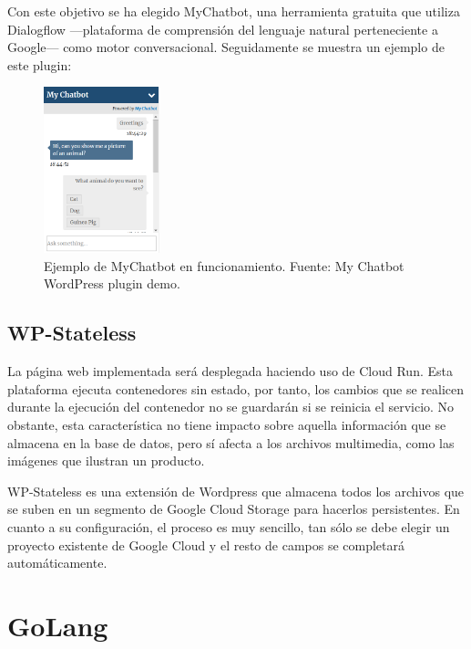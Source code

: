 Con este objetivo se ha elegido MyChatbot, una herramienta gratuita que utiliza Dialogflow —plataforma de comprensión del lenguaje natural perteneciente a Google— como motor conversacional. Seguidamente se muestra un ejemplo de este plugin:

\begin{figure}[ht]
    \begin{center}
    	\includegraphics[width = 0.30\textwidth]{Figuras/chatbotExample.PNG}
    \end{center}
    \caption{\label{fig:myChatbot} Ejemplo de MyChatbot en funcionamiento. Fuente: My Chatbot WordPress plugin demo.}
\end{figure}

\subsection{WP-Stateless}
La página web implementada será desplegada haciendo uso de Cloud Run. Esta plataforma ejecuta contenedores sin estado, por tanto, los cambios que se realicen durante la ejecución del contenedor no se guardarán si se reinicia el servicio. No obstante, esta característica no tiene impacto sobre aquella información que se almacena en la base de datos, pero sí afecta a los archivos multimedia, como las imágenes que ilustran un producto.

WP-Stateless es una extensión de Wordpress que almacena todos los archivos que se suben en un segmento de Google Cloud Storage para hacerlos persistentes. En cuanto a su configuración, el proceso es muy sencillo, tan sólo se debe elegir un proyecto existente de Google Cloud y el resto de campos se completará automáticamente.

\newpage

\section{GoLang}

